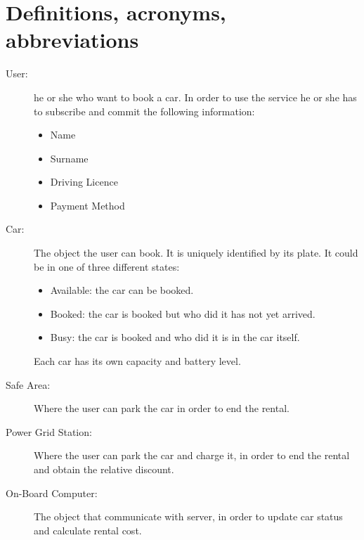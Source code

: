 \section{Definitions, acronyms, abbreviations}
\begin{description}
	\item [User:] he or she who want to book a car. In order to use the service he or she has to subscribe and commit the following information:
	\begin{itemize}
		\item Name
		\item Surname
		\item Driving Licence
		\item Payment Method
	\end{itemize}
	\item [Car:] The object the user can book. It is uniquely identified by its plate. It could be in one of three different states:
	\begin{itemize}
		\item Available: the car can be booked.
		\item Booked: the car is booked but who did it has not yet arrived.
		\item Busy: the car is booked and who did it is in the car itself.
	\end{itemize}
	Each car has its own capacity and battery level.
	\item [Safe Area:] Where the user can park the car in order to end the rental.
	\item [Power Grid Station:] Where the user can park the car and charge it, in order to end the rental and obtain the relative discount.
	\item [On-Board Computer:] The object that communicate with server, in order to update car status and calculate rental cost.
	
\end{description}
